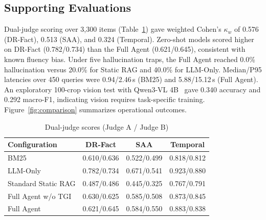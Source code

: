 \documentclass[conference]{IEEEtran}
\begin{document}
\subsection{Supporting Evaluations}
Dual-judge scoring over 3,300 items (Table~\ref{tab:judge}) gave weighted Cohen's $\kappa_w$ of 0.576 (DR-Fact), 0.513 (SAA), and 0.324 (Temporal). Zero-shot models scored higher on DR-Fact (0.782/0.734) than the Full Agent (0.621/0.645), consistent with known fluency bias. Under five hallucination traps, the Full Agent reached 0.0\% hallucination versus 20.0\% for Static RAG and 40.0\% for LLM-Only. Median/P95 latencies over 450 queries were 0.94/2.46\,s (BM25) and 5.88/15.12\,s (Full Agent). An exploratory 100-crop vision test with Qwen3-VL 4B~\cite{qwenvl} gave 0.340 accuracy and 0.292 macro-F1, indicating vision requires task-specific training. Figure~\ref{fig:comparison} summarizes operational outcomes.
\begin{table}[t]
\caption{Dual-judge scores (Judge A / Judge B)}
\label{tab:judge}
\centering\scriptsize\setlength{\tabcolsep}{2pt}
\begin{tabular*}{\columnwidth}{@{\extracolsep{\fill}}lccc@{}}
\toprule
Configuration & DR-Fact & SAA & Temporal \\
\midrule
BM25 & 0.610/0.636 & 0.522/0.499 & 0.818/0.812 \\
LLM-Only & 0.782/0.734 & 0.671/0.541 & 0.923/0.880 \\
Standard Static RAG & 0.487/0.486 & 0.445/0.325 & 0.767/0.791 \\
Full Agent w/o TGI & 0.630/0.625 & 0.585/0.508 & 0.873/0.845 \\
Full Agent & 0.621/0.645 & 0.584/0.550 & 0.883/0.838 \\
\bottomrule
\end{tabular*}
\end{table}
\end{document}
